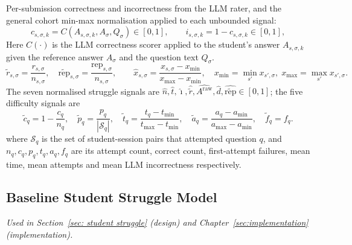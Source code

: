 Per-submission correctness and incorrectness from the LLM rater, and the general cohort min-max
normalisation applied to each unbounded signal:
\[
    c_{s,\sigma,k} = C(A_{s,\sigma,k},A_{\sigma},Q_{\sigma}) \in [0,1],
    \qquad
    i_{s,\sigma,k} = 1 - c_{s,\sigma,k} \in [0,1],
\]
Here $C(\cdot)$ is the LLM correctness scorer applied to the student's answer $A_{s,\sigma,k}$ given the reference answer $A_\sigma$ and the question text $Q_\sigma$.
\[
    \tilde{r}_{s,\sigma} = \frac{r_{s,\sigma}}{n_{s,\sigma}}, \quad
    \tilde{\mathrm{rep}}_{s,\sigma} = \frac{\mathrm{rep}_{s,\sigma}}{n_{s,\sigma}},
    \qquad
    \hat{x}_{s,\sigma} = \frac{x_{s,\sigma} - x_{\min}}{x_{\max} - x_{\min}}, \quad
    x_{\min} = \min_{s'} x_{s',\sigma},\; x_{\max} = \max_{s'} x_{s',\sigma}.
\]
The seven normalised struggle signals are $\hat{n},\hat{t},\hat{\imath},\hat{\tilde{r}},\widehat{A^{\mathrm{raw}}},\hat{d},\widehat{\tilde{\mathrm{rep}}} \in [0,1]$; the five difficulty signals are
\[
    \tilde{c}_{q} = 1 - \frac{c_{q}}{n_{q}}, \quad
    \tilde{p}_{q} = \frac{p_{q}}{|\mathcal{S}_{q}|}, \quad
    \tilde{t}_{q} = \frac{t_{q}-t_{\min}}{t_{\max}-t_{\min}}, \quad
    \tilde{a}_{q} = \frac{a_{q}-a_{\min}}{a_{\max}-a_{\min}}, \quad
    \tilde{f}_{q} = f_{q}.
\]
where $\mathcal{S}_q$ is the set of student-session pairs that attempted question $q$, and $n_q,c_q,p_q,t_q,a_q,f_q$ are its attempt count, correct count, first-attempt failures, mean time, mean attempts and mean LLM incorrectness respectively.

\subsection{Baseline Student Struggle Model}
\emph{Used in Section~\ref{sec: student struggle} (design) and Chapter~\ref{sec:implementation} (implementation).}


